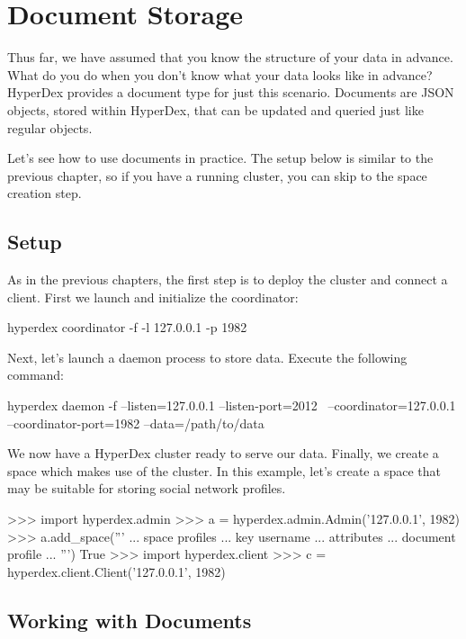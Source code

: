 \chapter{Document Storage}
\label{chap:documents}

Thus far, we have assumed that you know the structure of your data in advance.
What do you do when you don't know what your data looks like in advance?
HyperDex provides a document type for just this scenario.  Documents are JSON
objects, stored within HyperDex, that can be updated and queried just like
regular objects.

Let's see how to use documents in practice.  The setup below is similar to the
previous chapter, so if you have a running cluster, you can skip to the space
creation step.

\section{Setup}
\label{sec:documents:setup}

As in the previous chapters, the first step is to deploy the cluster and connect
a client.   First we launch and initialize the coordinator:

\begin{consolecode}
hyperdex coordinator -f -l 127.0.0.1 -p 1982
\end{consolecode}

Next, let's launch a daemon process to store data.  Execute the following
command:

\begin{consolecode}
hyperdex daemon -f --listen=127.0.0.1 --listen-port=2012 \
                   --coordinator=127.0.0.1 --coordinator-port=1982 --data=/path/to/data
\end{consolecode}

We now have a HyperDex cluster ready to serve our data.  Finally, we create a
space which makes use of the cluster.  In this example, let's create a space
that may be suitable for storing social network profiles.

\begin{pythoncode}
>>> import hyperdex.admin
>>> a = hyperdex.admin.Admin('127.0.0.1', 1982)
>>> a.add_space('''
... space profiles
... key username
... attributes
...    document profile
... ''')
True
>>> import hyperdex.client
>>> c = hyperdex.client.Client('127.0.0.1', 1982)
\end{pythoncode}

\section{Working with Documents}
\label{sec:documents:working}


